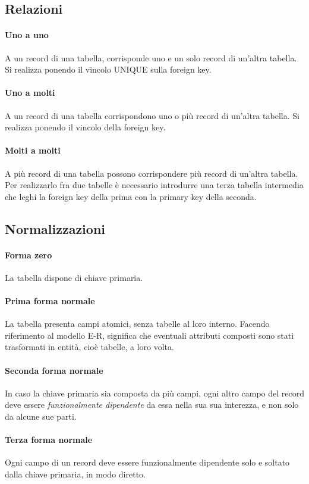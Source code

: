 \documentclass{article}
\begin{document}
    \subsection{Relazioni}
        \paragraph{Uno a uno} A un record di una tabella, corrisponde uno e un solo record di un'altra tabella. Si realizza ponendo il vincolo UNIQUE sulla foreign key.
        \paragraph{Uno a molti} A un record di una tabella corrispondono uno o più record di un'altra tabella. Si realizza ponendo il vincolo della foreign key.
        \paragraph{Molti a molti} A più record di una tabella possono corrispondere più record di un'altra tabella. Per realizzarlo fra due tabelle è necessario introdurre una terza tabella intermedia che leghi la foreign key della prima con la primary key della seconda.
    
    \subsection{Normalizzazioni}
        \paragraph{Forma zero} La tabella dispone di chiave primaria.
        \paragraph{Prima forma normale} La tabella presenta campi atomici, senza tabelle al loro interno. Facendo riferimento al modello E-R, significa che eventuali attributi composti sono stati trasformati in entità, cioè tabelle, a loro volta.
        \paragraph{Seconda forma normale} In caso la chiave primaria sia composta da più campi, ogni altro campo del record deve essere \textit{funzionalmente dipendente} da essa nella sua sua interezza, e non solo da alcune sue parti.
        \paragraph{Terza forma normale} Ogni campo di un record deve essere funzionalmente dipendente solo e soltato dalla chiave primaria, in modo diretto.
\end{document}
